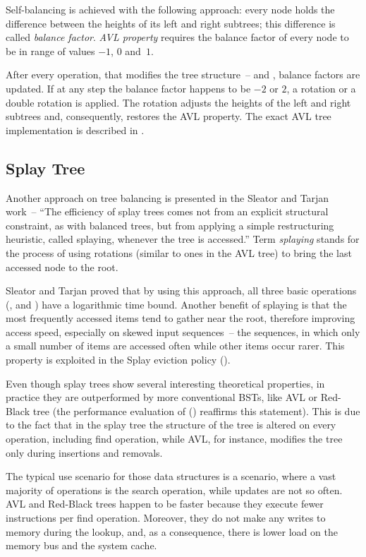 Self-balancing is achieved with the following approach: every node holds the difference between the heights of its left and right subtrees; this difference is called \emph{balance factor}.
\emph{AVL property} requires the balance factor of every node to be in range of values $-1$, $0$ and~$1$.

After every operation, that modifies the tree structure~-- \insertop and \removeop, balance factors are updated.
If at any step the balance factor happens to be $-2$ or $2$, a rotation or a double rotation is applied.
The rotation adjusts the heights of the left and right subtrees and, consequently, restores the AVL property. The exact AVL tree implementation is described in \cite[p.~458]{knuth3}.

\subsection{Splay Tree}
\label{sssec:splay}
Another approach on tree balancing is presented in the Sleator and Tarjan work\cite{splay_tree}~-- ``The efficiency of splay trees comes not from an explicit structural constraint, as with balanced trees, but from applying a simple restructuring heuristic, called splaying, whenever the tree is accessed.'' Term \emph{splaying} stands for the process of using rotations (similar to ones in the AVL tree) to bring the last accessed node to the root.

Sleator and Tarjan proved that by using this approach, all three basic operations (\findop, \insertop and \removeop) have a logarithmic time bound. Another benefit of splaying is that the most frequently accessed items tend to gather near the root, therefore improving access speed, especially on skewed input sequences~-- the sequences, in which only a small number of items are accessed often while other items occur rarer. This property is exploited in the Splay eviction policy ().

Even though splay trees show several interesting theoretical properties, in practice they are outperformed by more conventional BSTs, like AVL or Red-Black tree\cite{splay_overview} (the performance evaluation of \numdbname () reaffirms this statement). This is due to the fact that in the splay tree the structure of the tree is altered on every operation, including find operation, while AVL, for instance, modifies the tree only during insertions and removals.

The typical use scenario for those data structures is a scenario, where a vast majority of operations is the search operation, while updates are not so often. AVL and Red-Black trees happen to be faster because they execute fewer instructions per find operation. Moreover, they do not make any writes to memory during the lookup, and, as a consequence, there is lower load on the memory bus and the system cache.

